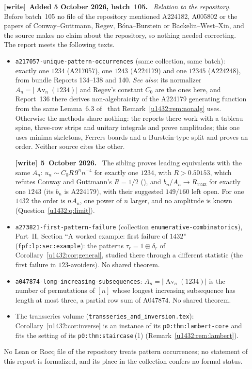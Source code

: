 \documentclass[11pt]{article}
\theoremstyle{remark}\newtheorem{remark}[theorem]{Remark}
\newcommand{\Av}{\operatorname{Av}}
\newcommand{\file}[1]{\nolinkurl{#1}}
\newenvironment{writenote}[1][]{\par\smallskip\begingroup\small
 \noindent\textbf{[write]}\if\relax\detokenize{#1}\relax\else~\textbf{#1.}\fi\ }%
 {\par\endgroup\smallskip}
\begin{document}
\begin{writenote}[Added 5 October 2026, batch~105]
\emph{Relation to the repository.} Before batch~105 no file of the
repository mentioned A224182, A005802 or the papers of Conway--Guttmann,
Regev, B\'ona--Burstein or Backelin--West--Xin, and the source makes no claim
about the repository, so nothing needed correcting. The report meets the
following texts.
\begin{itemize}\raggedright
\item \file{a217057-unique-pattern-occurrences} (same collection, same
 batch): exactly one $1234$ (A217057), one $1243$ (A224179) and one $12345$
 (A224248), from bundle Reports 134--138 and 140. \emph{See also}: its
 normalizer $A_n=|\Av_n(1234)|$ and Regev's constant $C_0$ are the ones here,
 and Report~136 there derives non-algebraicity of the A224179 generating
 function from the same Lemma~6.3 of~\cite{BB} that
 Remark~\ref{u1432:rem:nonalg} uses. Otherwise the methods share nothing:
 the reports there work with a tableau spine, three-row strips and unitary
 integrals and prove amplitudes; this one uses minima skeletons, Ferrers
 boards and a Burstein-type split and proves an order. Neither source cites
 the other.
 \begin{writenote}[5~October 2026]
 The sibling proves leading equivalents with the same $A_n$:
 $u_n\sim C_0R\,9^nn^{-4}$ for exactly one $1234$, with $R>0.50153$, which
 refutes Conway and Guttmann's $R=1/2$ (\cite[Section~5.1]{CG}), and
 $b_n/A_n\to R_{1243}$ for exactly one $1243$ (its $b_n$ is A224179), with
 their suggested $149/160$ left open. For one $1432$ the order is $nA_n$,
 one power of $n$ larger, and no amplitude is known
 (Question~\ref{u1432:q:limit}).
 \end{writenote}
\item \file{a273821-first-pattern-failure} (collection
 \file{enumerative-combinatorics}), Part~II, Section ``A worked example:
 first failure of $1432$'' (\file{fpf:lp:sec:example}): the patterns
 $\tau_r=1\oplus\delta_r$ of Corollary~\ref{u1432:cor:general}, studied there
 through a different statistic (the first failure in $123$-avoiders). No
 shared theorem.
\item \file{a047874-long-increasing-subsequences}: $A_n=|\Av_n(1234)|$ is the
 number of permutations of $[n]$ whose longest increasing subsequence has
 length at most three, a partial row sum of A047874. No shared theorem.
\item The transseries volume
 (\file{transseries_and_inversion.tex}): Corollary~\ref{u1432:cor:inverse}
 is an instance of its \file{p0:thm:lambert-core} and fits the setting of
 its \file{p0:thm:staircase}\,(1) (Remark~\ref{u1432:rem:lambert}).
\end{itemize}
No Lean or Rocq file of the repository treats pattern occurrences; no
statement of this report is formalized, and its place in the collection
confers no formal status.
\end{writenote}
\end{document}

